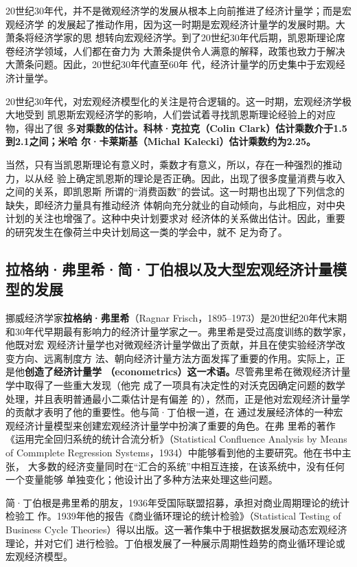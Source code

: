 20世纪30年代，并不是微观经济学的发展从根本上向前推进了经济计量学；而是宏观经济学
的发展起了推动作用，因为这一时期是宏观经济计量学的发展时期。大萧条将经济学家的思
想转向宏观经济学。到了20世纪30年代后期，凯恩斯理论席卷经济学领域，人们都在奋力为
大萧条提供令人满意的解释，政策也致力于解决大萧条问题。因此，20世纪30年代直至60年
代，经济计量学的历史集中于宏观经济计量学。

20世纪30年代，对宏观经济模型化的关注是符合逻辑的。这一时期，宏观经济学极大地受到
凯恩斯宏观经济学的影响，人们尝试着寻找凯恩斯理论经验上的对应物，得出了很
多\textbf{对乘数的估计。科林·克拉克（Colin Clark）估计乘数介于1.5到2.1之间；米哈
  尔·卡莱斯基（Michal Kalecki）估计乘数约为2.25。}

当然，只有当凯恩斯理论有意义时，乘数才有意义，所以，存在一种强烈的推动力，以从经
验上确定凯恩斯的理论是否正确。因此，出现了很多度量消费与收入之间的关系，即凯恩斯
所谓的“消费函数”的尝试。这一时期也出现了下列信念的缺失，即经济力量具有推动经济
体朝向充分就业的自动倾向，与此相应，对中央计划的关注也增强了。这种中央计划要求对
经济体的关系做出估计。因此，重要的研究发生在像荷兰中央计划局这一类的学会中，就不
足为奇了。

\subsection{拉格纳·弗里希·简·丁伯根以及大型宏观经济计量模型的发展}

挪威经济学家\textbf{拉格纳·弗里希}（Ragnar Frisch，1895--1973）是20世纪20年代末期
和30年代早期最有影响力的经济计量学家之一。弗里希是受过高度训练的数学家，他既对宏
观经济计量学也对微观经济计量学做出了贡献，并且在使实验经济学改变方向、远离制度方
法、朝向经济计量方法方面发挥了重要的作用。实际上，正是他\textbf{创造了经济计量学
  （econometrics）这一术语。}尽管弗里希在微观经济计量学中取得了一些重大发现（他完
成了一项具有决定性的对沃克因确定问题的数学处理，并且表明普通最小二乘估计是有偏差
的），然而，正是他对宏观经济计量学的贡献才表明了他的重要性。他与简·丁伯根一道，在
通过发展经济体的一种宏观经济计量模型来创建宏观经济计量学中扮演了重要的角色。在弗
里希的著作《运用完全回归系统的统计合流分析》（Statistical Confluence Analysis by
Means of Commplete Regression Systems，1934）中能够看到他的主要研究。他在书中主张，
大多数的经济变量同时在“汇合的系统”中相互连接，在该系统中，没有任何一个变量能够
单独变化；他设计出了多种方法来处理这些问题。

简·丁伯根是弗里希的朋友，1936年受国际联盟招募，承担对商业周期理论的统计检验工
作。1939年他的报告《商业循环理论的统计检验》（Statistical Testing of Business
Cycle Theories）得以出版。这一著作集中于根据数据发展动态宏观经济理论，并对它们
进行检验。丁伯根发展了一种展示周期性趋势的商业循环理论或宏观经济模型。

